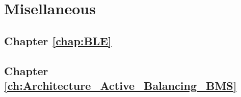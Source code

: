 \chapter{Misellaneous}\label{chap:miselleneous}
\section{Chapter \ref{chap:BLE}}

\section{Chapter \ref{ch:Architecture_Active_Balancing_BMS}}
